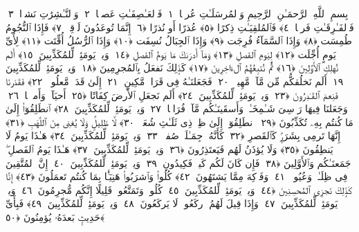 
  
    
  
    
    

\nopagebreak
  بِسمِ ٱللَّهِ ٱلرَّحمَـٰنِ ٱلرَّحِيمِ
  وَٱلمُرسَلَـٰتِ عُرفًۭا ﴿١﴾
 فَٱلعَـٰصِفَـٰتِ عَصفًۭا ﴿٢﴾
 وَٱلنَّـٰشِرَٰتِ نَشرًۭا ﴿٣﴾
 فَٱلفَـٰرِقَـٰتِ فَرقًۭا ﴿٤﴾
 فَٱلمُلقِيَـٰتِ ذِكرًا ﴿٥﴾
 عُذرًا أَو نُذرًا ﴿٦﴾
 إِنَّمَا تُوعَدُونَ لَوَٟقِعٌۭ ﴿٧﴾
 فَإِذَا ٱلنُّجُومُ طُمِسَت ﴿٨﴾
 وَإِذَا ٱلسَّمَآءُ فُرِجَت ﴿٩﴾
 وَإِذَا ٱلجِبَالُ نُسِفَت ﴿١٠﴾
 وَإِذَا ٱلرُّسُلُ أُقِّتَت ﴿١١﴾
 لِأَىِّ يَومٍ أُجِّلَت ﴿١٢﴾
 لِيَومِ ٱلفَصلِ ﴿١٣﴾
 وَمَآ أَدرَىٰكَ مَا يَومُ ٱلفَصلِ ﴿١٤﴾
 وَيلٌۭ يَومَئِذٍۢ لِّلمُكَذِّبِينَ ﴿١٥﴾
 أَلَم نُهلِكِ ٱلأَوَّلِينَ ﴿١٦﴾
 ثُمَّ نُتبِعُهُمُ ٱلءَاخِرِينَ ﴿١٧﴾
 كَذَٟلِكَ نَفعَلُ بِٱلمُجرِمِينَ ﴿١٨﴾
 وَيلٌۭ يَومَئِذٍۢ لِّلمُكَذِّبِينَ ﴿١٩﴾
 أَلَم نَخلُقكُّم مِّن مَّآءٍۢ مَّهِينٍۢ ﴿٢٠﴾
 فَجَعَلنَـٰهُ فِى قَرَارٍۢ مَّكِينٍ ﴿٢١﴾
 إِلَىٰ قَدَرٍۢ مَّعلُومٍۢ ﴿٢٢﴾
 فَقَدَرنَا فَنِعمَ ٱلقَـٰدِرُونَ ﴿٢٣﴾
 وَيلٌۭ يَومَئِذٍۢ لِّلمُكَذِّبِينَ ﴿٢٤﴾
 أَلَم نَجعَلِ ٱلأَرضَ كِفَاتًا ﴿٢٥﴾
 أَحيَآءًۭ وَأَموَٟتًۭا ﴿٢٦﴾
 وَجَعَلنَا فِيهَا رَوَٟسِىَ شَـٰمِخَـٰتٍۢ وَأَسقَينَـٰكُم مَّآءًۭ فُرَاتًۭا ﴿٢٧﴾
 وَيلٌۭ يَومَئِذٍۢ لِّلمُكَذِّبِينَ ﴿٢٨﴾
 ٱنطَلِقُوٓا۟ إِلَىٰ مَا كُنتُم بِهِۦ تُكَذِّبُونَ ﴿٢٩﴾
 ٱنطَلِقُوٓا۟ إِلَىٰ ظِلٍّۢ ذِى ثَلَـٰثِ شُعَبٍۢ ﴿٣٠﴾
 لَّا ظَلِيلٍۢ وَلَا يُغنِى مِنَ ٱللَّهَبِ ﴿٣١﴾
 إِنَّهَا تَرمِى بِشَرَرٍۢ كَٱلقَصرِ ﴿٣٢﴾
 كَأَنَّهُۥ جِمَـٰلَتٌۭ صُفرٌۭ ﴿٣٣﴾
 وَيلٌۭ يَومَئِذٍۢ لِّلمُكَذِّبِينَ ﴿٣٤﴾
 هَـٰذَا يَومُ لَا يَنطِقُونَ ﴿٣٥﴾
 وَلَا يُؤذَنُ لَهُم فَيَعتَذِرُونَ ﴿٣٦﴾
 وَيلٌۭ يَومَئِذٍۢ لِّلمُكَذِّبِينَ ﴿٣٧﴾
 هَـٰذَا يَومُ ٱلفَصلِ ۖ جَمَعنَـٰكُم وَٱلأَوَّلِينَ ﴿٣٨﴾
 فَإِن كَانَ لَكُم كَيدٌۭ فَكِيدُونِ ﴿٣٩﴾
 وَيلٌۭ يَومَئِذٍۢ لِّلمُكَذِّبِينَ ﴿٤٠﴾
 إِنَّ ٱلمُتَّقِينَ فِى ظِلَـٰلٍۢ وَعُيُونٍۢ ﴿٤١﴾
 وَفَوَٟكِهَ مِمَّا يَشتَهُونَ ﴿٤٢﴾
 كُلُوا۟ وَٱشرَبُوا۟ هَنِيٓـًٔۢا بِمَا كُنتُم تَعمَلُونَ ﴿٤٣﴾
 إِنَّا كَذَٟلِكَ نَجزِى ٱلمُحسِنِينَ ﴿٤٤﴾
 وَيلٌۭ يَومَئِذٍۢ لِّلمُكَذِّبِينَ ﴿٤٥﴾
 كُلُوا۟ وَتَمَتَّعُوا۟ قَلِيلًا إِنَّكُم مُّجرِمُونَ ﴿٤٦﴾
 وَيلٌۭ يَومَئِذٍۢ لِّلمُكَذِّبِينَ ﴿٤٧﴾
 وَإِذَا قِيلَ لَهُمُ ٱركَعُوا۟ لَا يَركَعُونَ ﴿٤٨﴾
 وَيلٌۭ يَومَئِذٍۢ لِّلمُكَذِّبِينَ ﴿٤٩﴾
 فَبِأَىِّ حَدِيثٍۭ بَعدَهُۥ يُؤمِنُونَ ﴿٥٠﴾
 
